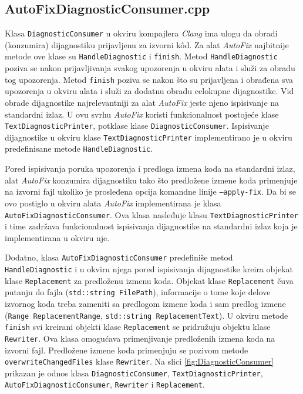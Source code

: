 \documentclass[12pt,oneside]{memoir}
\begin{document}
\subsection{AutoFixDiagnosticConsumer.cpp}
Klasa \texttt{DiagnosticConsumer} u okviru kompajlera \textit{Clang} ima ulogu da obradi (konzumira) dijagnostiku prijavljenu
za izvorni k\^{o}d. Za alat \textit{AutoFix} najbitnije metode ove klase su \texttt{HandleDiagnostic} i \texttt{finish}. Metod \texttt{HandleDiagnostic} poziva se nakon prijavljivanja svakog upozorenja u okviru alata i slu\v{z}i za obradu tog upozorenja. Metod \texttt{finish} poziva se nakon \v{s}to su prijavljena i obrađena sva upozorenja u okviru alata i slu\v{z}i za dodatnu obradu celokupne dijagnostike. Vid obrade dijagnostike najrelevantniji za alat \textit{AutoFix} jeste njeno ispisivanje na standardni izlaz. U ovu 
svrhu \textit{AutoFix} koristi funkcionalnost postoje\'{c}e klase \texttt{TextDiagnosticPrinter}, potklase klase \texttt{DiagnosticConsumer}. Ispisivanje dijagnostike u okviru klase \texttt{TextDiagnosticPrinter} implementirano je u okviru predefinisane metode \texttt{HandleDiagnostic}. \par
Pored ispisivanja poruka upozorenja i predloga izmena koda na standardni izlaz, alat \textit{AutoFix} konzumira dijagnostiku tako \v{s}to predlo\v{z}ene izmene koda primenjuje na izvorni fajl ukoliko je prosleđena opcija komandne linije \texttt{--apply-fix}.
Da bi se ovo postiglo u okviru alata \textit{AutoFix} implementirana je klasa \texttt{AutoFix\-DiagnosticConsumer}. Ova klasa nasleđuje
klasu \texttt{TextDiagnosticPrinter} i time zadr\v{z}ava funkcionalnost ispisivanja dijagnostike na standardni izlaz koja je implementirana u okviru nje. \par Dodatno, klasa \texttt{AutoFixDiagnosticConsumer} predefini\v{s}e metod \texttt{HandleDiag\-nostic} i u okviru njega pored ispisivanja dijagnostike kreira objekat klase \texttt{Replace\-ment} za predlo\v{z}enu izmenu koda. Objekat klase \texttt{Replacement} \v{c}uva putanju do fajla (\texttt{std::string FilePath}), informacije o tome koje delove izvornog koda treba zameniti sa predlogom izmene koda i sam predlog izmene (\texttt{Range ReplacementRange}, \texttt{std::string ReplacementText}).
U okviru metode \texttt{finish} svi kreirani objekti klase \texttt{Replacement} se pridru\v{z}uju objektu klase \texttt{Rewriter}.
Ova klasa omogu\'{c}ava primenjivanje predlo\v{z}enih izmena koda na izvorni fajl. Predlo\v{z}ene izmene koda primenjuju se pozivom metode \texttt{overwriteChangedFiles} klase \texttt{Rewriter}. Na slici \ref{fig:DiagnosticConsumer} prikazan je odnos klasa \texttt{DiagnosticConsumer}, \texttt{TextDiagnosticPrinter}, \texttt{AutoFixDiagnosticConsumer}, \texttt{Rewriter} i \texttt{Replacement}.
\end{document}
